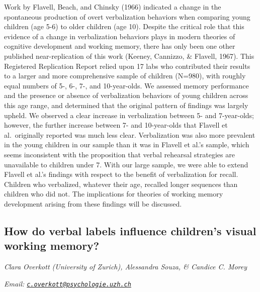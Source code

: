 \documentclass[
  12pt,
]{book}
\begin{document}
Work by Flavell, Beach, and Chinsky (1966) indicated a change in the spontaneous production of overt verbalization behaviors when comparing young children (age 5-6) to older children (age 10). Despite the critical role that this evidence of a change in verbalization behaviors plays in modern theories of cognitive development and working memory, there has only been one other published near-replication of this work (Keeney, Cannizzo, \& Flavell, 1967). This Registered Replication Report relied upon 17 labs who contributed their results to a larger and more comprehensive sample of children (N=980), with roughly equal numbers of 5-, 6-, 7-, and 10-year-olds. We assessed memory performance and the presence or absence of verbalization behaviors of young children across this age range, and determined that the original pattern of findings was largely upheld. We observed a clear increase in verbalization between 5- and 7-year-olds; however, the further increase between 7- and 10-year-olds that Flavell et al.~originally reported was much less clear. Verbalization was also more prevalent in the young children in our sample than it was in Flavell et al.'s sample, which seems inconsistent with the proposition that verbal rehearsal strategies are unavailable to children under 7. With our large sample, we were able to extend Flavell et al.'s findings with respect to the benefit of verbalization for recall. Children who verbalized, whatever their age, recalled longer sequences than children who did not. The implications for theories of working memory development arising from these findings will be discussed.

\hypertarget{how-do-verbal-labels-influence-childrens-visual-working-memory}{%
\subsection{How do verbal labels influence children's visual working memory?}\label{how-do-verbal-labels-influence-childrens-visual-working-memory}}

\emph{Clara Overkott (University of Zurich), Alessandra Souza, \& Candice C. Morey}

\emph{Email: \href{mailto:c.overkott@psychologie.uzh.ch}{\nolinkurl{c.overkott@psychologie.uzh.ch}}}
\end{document}
